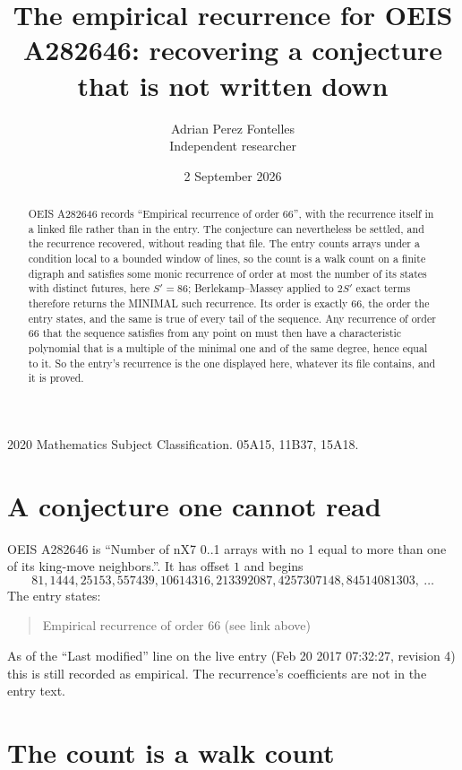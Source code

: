 \documentclass[11pt,a4paper]{article}
\title{The empirical recurrence for OEIS A282646: recovering a conjecture that is not written down}
\author{Adrian Perez Fontelles\\ \small Independent researcher}
\date{2 September 2026}
\theoremstyle{plain}
\theoremstyle{definition}
\begin{document}
\maketitle

\begin{abstract}
OEIS A282646 records ``Empirical recurrence of order $66$'', with the recurrence itself in a
linked file rather than in the entry. The conjecture can nevertheless be settled, and the
recurrence recovered, without reading that file. The entry counts arrays under a condition
local to a bounded window of lines, so the count is a walk count on a finite digraph and
satisfies some monic recurrence of order at most the number of its states with distinct
futures, here $S'=86$; Berlekamp--Massey applied to $2S'$ exact
terms therefore returns the MINIMAL such recurrence. Its order is exactly $66$, the order
the entry states, and the same is true of every tail of the sequence. Any recurrence of order
$66$ that the sequence satisfies from any point on must then have a characteristic
polynomial that is a multiple of the minimal one and of the same degree, hence equal to it. So
the entry's recurrence is the one displayed here, whatever its file contains, and it is
proved.
\end{abstract}

\noindent\small 2020 Mathematics Subject Classification. 05A15, 11B37, 15A18.\normalsize

\section{A conjecture one cannot read}

OEIS A282646 is ``Number of nX7 0..1 arrays with no 1 equal to more than one of its king-move neighbors.''. It has offset $1$ and begins
\[
81, 1444, 25153, 557439, 10614316, 213392087, 4257307148, 84514081303,\ \dots
\]
The entry states:
\begin{quote}
Empirical recurrence of order 66 (see link above)
\end{quote}
As of the ``Last modified'' line on the live entry (Feb 20 2017 07:32:27, revision 4) this is still
recorded as empirical. The recurrence's coefficients are not in the entry text.

\section{The count is a walk count}
\end{document}
